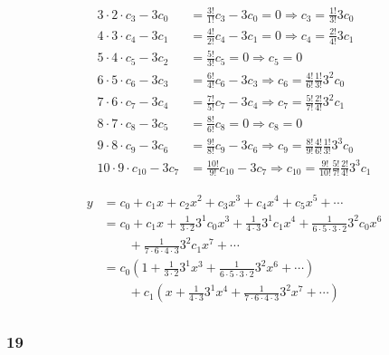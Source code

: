 \documentclass{article}
\begin{document}
\begin{align*}
  3 \cdot 2 \cdot c_3 - 3 c_0   & = \frac{3!}{1!} c_3 - 3 c_0 = 0 \Rightarrow c_3 = \frac{1!}{3!} 3 c_0                               \\
  4 \cdot 3 \cdot c_4 - 3 c_1   & = \frac{4!}{2!} c_4 - 3 c_1 = 0 \Rightarrow c_4 = \frac{2!}{4!} 3 c_1                               \\
  5 \cdot 4 \cdot c_5 - 3 c_2   & = \frac{5!}{3!} c_5 = 0 \Rightarrow c_5 = 0                                                         \\
  6 \cdot 5 \cdot c_6 - 3 c_3   & = \frac{6!}{4!} c_6 - 3 c_3 \Rightarrow c_6 = \frac{4!}{6!} \frac{1!}{3!} 3^2 c_0                   \\
  7 \cdot 6 \cdot c_7 - 3 c_4   & = \frac{7!}{5!} c_7 - 3 c_4 \Rightarrow c_7 = \frac{5!}{7!} \frac{2!}{4!} 3^2 c_1                   \\
  8 \cdot 7 \cdot c_8 - 3 c_5   & = \frac{8!}{6!} c_8 = 0 \Rightarrow c_8 = 0                                                         \\
  9 \cdot 8 \cdot c_9 - 3 c_6   & = \frac{9!}{8!} c_9 - 3 c_6 \Rightarrow c_9 = \frac{8!}{9!} \frac{4!}{6!} \frac{1!}{3!} 3^3 c_0     \\
  10 \cdot 9 \cdot c_10 - 3 c_7 & = \frac{10!}{9!} c_10 - 3 c_7 \Rightarrow c_10 = \frac{9!}{10!} \frac{5!}{7!} \frac{2!}{4!} 3^3 c_1
\end{align*}

\begin{align*}
  y & = c_0 + c_1 x + c_2 x^2 + c_3 x^3 + c_4 x^4 + c_5 x^5 + \cdots                                                                      \\
    & = c_0 + c_1 x + \frac{1}{3 \cdot 2} 3^1 c_0 x^3 + \frac{1}{4 \cdot 3} 3^1 c_1 x^4 + \frac{1}{6 \cdot 5 \cdot 3 \cdot 2} 3^2 c_0 x^6 \\
    & \qquad + \frac{1}{7 \cdot 6 \cdot 4 \cdot 3} 3^2 c_1 x^7 + \cdots                                                                   \\
    & = c_0 \left( 1 + \frac{1}{3 \cdot 2} 3^1 x^3 + \frac{1}{6 \cdot 5 \cdot 3 \cdot 2} 3^2 x^6 + \cdots \right)                         \\
    & \qquad + c_1 \left( x + \frac{1}{4 \cdot 3} 3^1 x^4 + \frac{1}{7 \cdot 6 \cdot 4 \cdot 3} 3^2 x^7 + \cdots \right)                  \\
\end{align*}

\subsubsection{19}
\end{document}
